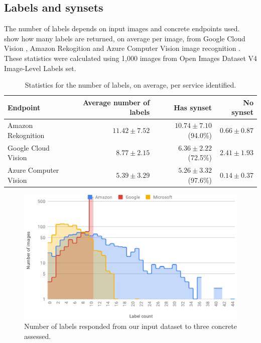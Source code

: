 \subsection{Labels and synsets}\label{icwe2019:sec:label-synsets}

The number of labels depends on input images and concrete  endpoints used.
 show how many labels are returned, on average per image, from Google Cloud Vision , Amazon Rekogition  and Azure Computer Vision  image recognition . These statistics were calculated using 1,000 images from Open Images Dataset V4  Image-Level Labels set.

\begin{table}
\caption[Statistics for the number of labels]{Statistics for the number of labels, on average, per service identified.}\label{icwe2019:tab:label-count}
\centering
\begin{tabular}{l|rrr}
\toprule
\textbf{Endpoint} & \textbf{Average number of labels} & \textbf{Has synset} & \textbf{No synset} \\
\midrule
Amazon Rekognition & $11.42 \pm 7.52$ & $10.74 \pm 7.10$ (94.0\%) & $0.66 \pm 0.87$ \\
Google Cloud Vision & $8.77 \pm 2.15$ & $6.36 \pm 2.22$ (72.5\%) & $2.41 \pm 1.93$ \\
Azure Computer Vision & $5.39 \pm 3.29$ & $5.26 \pm 3.32$ (97.6\%) & $0.14 \pm 0.37$ \\
\bottomrule
\end{tabular}
\end{table}

\begin{figure}
\centering\includegraphics[width=.9\linewidth]{label_count1}
\caption[Label counts per  assessed]{Number of labels responded from our input dataset to three concrete  assessed.}
\label{icwe2019:fig:label-count1}
\end{figure}

